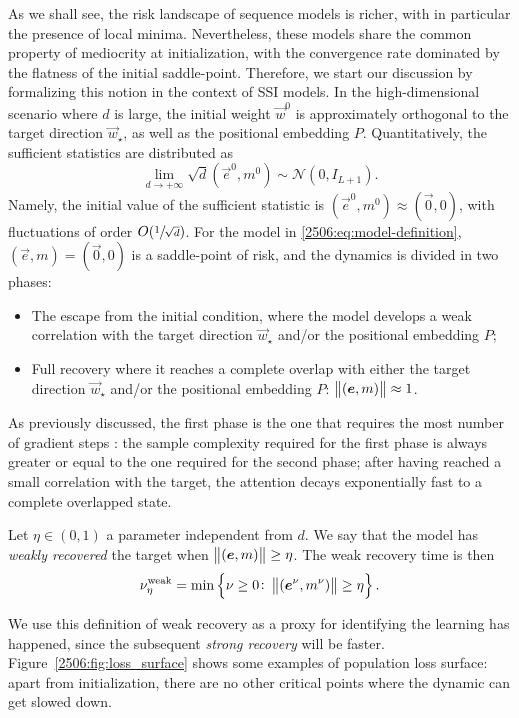 As we shall see, the risk landscape of sequence models is richer, with in particular the presence of local minima. Nevertheless, these models share the common property of mediocrity at initialization, with the convergence rate dominated by the flatness of the initial saddle-point. Therefore, we start our discussion by formalizing this notion in the context of SSI models. 
In the high-dimensional scenario where $d$ is large, the initial weight \(\vec{w}^0\) is approximately orthogonal to the target direction \(\vec{w}_\star\), as well as the positional embedding \(P\). Quantitatively, the sufficient statistics are distributed as
\begin{equation}
    \lim_{d\to+\infty}\sqrt{d}(\vec{e}^0, m^0) \sim \mathcal{N}(0, I_{L+1}).
\end{equation}
Namely, the initial value of the sufficient statistic is \((\vec{e}^0, m^0)\approx (\vec{0}, 0)\), with fluctuations of order $O(\sfrac{1}{\sqrt{d}})$. For the model in \cref{2506:eq:model-definition}, $(\vec{e},m)=(\vec{0}, 0)$ is a saddle-point of risk, and the dynamics is divided in two phases:
\begin{itemize}
    \item The escape from the initial condition, where the model develops a weak correlation with the target direction \(\vec{w}_\star\) and/or the positional embedding \(P\);
    \item Full recovery where it reaches a complete overlap with either the target direction \(\vec{w}_\star\) and/or the positional embedding \(P\): \(\left\lVert ({\boldsymbol{e}}, m)\right\rVert\approx 1\). 
\end{itemize}
As previously discussed, the first phase is the one that requires the most number of gradient steps \cite{arous2021online,arnaboldi2024escaping}: the sample complexity required for the first phase is always greater or equal to the one required for the second phase; after having reached a small correlation with the target, the attention decays exponentially fast to a complete overlapped state.
\begin{definition} \label{2506:def:weak-recovery}
    Let \(\eta\in(0,1)\) a parameter independent from \(d\). We say that the model has \emph{weakly recovered} the target when \(\left\lVert ({\boldsymbol{e}}, m)\right\rVert\geq \eta\). The weak recovery time is then
    \[ \nu^\mathrm{weak}_\eta = \min\left\{\nu\ge0\colon \left\lVert ({\boldsymbol{e}}^\nu, m^\nu)\right\rVert\geq \eta\right\}.\]
\end{definition}
We use this definition of weak recovery as a proxy for identifying the learning has happened, since the subsequent \emph{strong recovery} will be faster. Figure~\ref{2506:fig:loss_surface} shows some examples of population loss surface: apart from initialization, there are no other critical points where the dynamic can get slowed down. 

